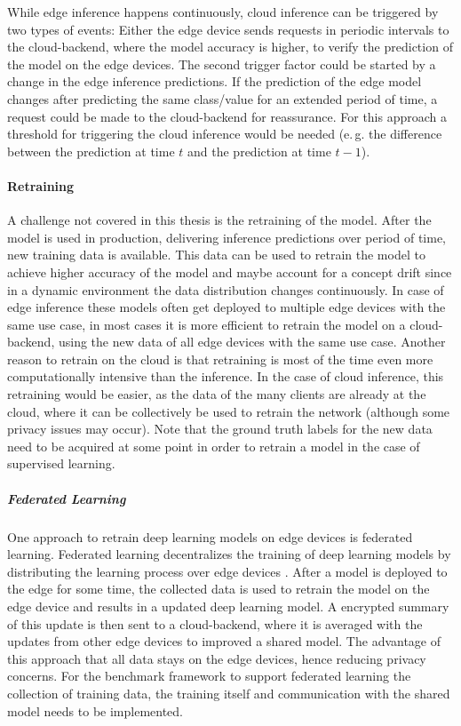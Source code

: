 While edge inference happens continuously, cloud inference can be triggered by two types of events:
Either the edge device sends requests in periodic intervals to the cloud-backend, where the model accuracy is higher, to verify the prediction of the model on the edge devices.
The second trigger factor could be started by a change in the edge inference predictions. If the prediction of the edge model changes after predicting the same class/value for an extended period of time, a request could be made to the cloud-backend for reassurance. For this approach a threshold for triggering the cloud inference would be needed (e.\,g. the difference between the prediction at time $t$ and the prediction at time $t-1$).



\paragraph{Retraining}
A challenge not covered in this thesis is the retraining of the model. After the model is used in production, delivering inference predictions over period of time, new training data is available. This data can be used to retrain the model to achieve higher accuracy of the model and maybe account for a concept drift since in a dynamic environment the data distribution changes continuously.
In case of edge inference these models often get deployed to multiple edge devices with the same use case, in most cases it is more efficient to retrain the model on a cloud-backend, using the new data of all edge devices with the same use case. Another reason to retrain on the cloud is that retraining is most of the time even more computationally intensive than the inference.
In the case of cloud inference, this retraining would be easier, as the data of the many clients are already at the cloud, where it can be collectively be used to retrain the network (although some privacy issues may occur).
Note that the ground truth labels for the new data need to be acquired at some point in order to retrain a model in the case of supervised learning.

\subparagraph{Federated Learning}
One approach to retrain deep learning models on edge devices is federated learning.
Federated learning decentralizes the training of deep learning models by distributing the learning process over edge devices  \cite{federateLearning,DBLP:journals/corr/KonecnyMYRSB16}.
After a model is deployed to the edge for some time, the collected data is used to retrain the model on the edge device and results in a updated deep learning model. 
A encrypted summary of this update is then sent to a cloud-backend, where it is averaged with the updates from other edge devices to improved a shared model.
The advantage of this approach that all data stays on the edge devices, hence reducing privacy concerns.
For the benchmark framework to support federated learning the collection of training data, the training itself and communication with the shared model needs to be implemented.
\endinput 
